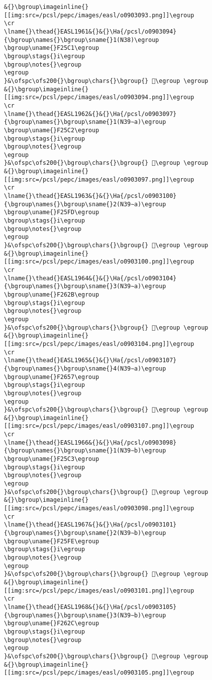 \begin{verbatim}
&{}\bgroup\imageinline{}[[img:src=/pcsl/pepc/images/easl/o0903093.png]]\egroup
\cr
\lname{}\thead{}EASL1961&{}&{}\Ha{/pcsl/o0903094}{\bgroup\names{}\bgroup\sname{}1(N38)\egroup
\bgroup\uname{}F25C1\egroup
\bgroup\stags{}i\egroup
\bgroup\notes{}\egroup
\egroup
}&\ofspc\ofs200{}\bgroup\chars{}\bgroup{} 󲗁\egroup \egroup
&{}\bgroup\imageinline{}[[img:src=/pcsl/pepc/images/easl/o0903094.png]]\egroup
\cr
\lname{}\thead{}EASL1962&{}&{}\Ha{/pcsl/o0903097}{\bgroup\names{}\bgroup\sname{}1(N39∼a)\egroup
\bgroup\uname{}F25C2\egroup
\bgroup\stags{}i\egroup
\bgroup\notes{}\egroup
\egroup
}&\ofspc\ofs200{}\bgroup\chars{}\bgroup{} 󲗂\egroup \egroup
&{}\bgroup\imageinline{}[[img:src=/pcsl/pepc/images/easl/o0903097.png]]\egroup
\cr
\lname{}\thead{}EASL1963&{}&{}\Ha{/pcsl/o0903100}{\bgroup\names{}\bgroup\sname{}2(N39∼a)\egroup
\bgroup\uname{}F25FD\egroup
\bgroup\stags{}i\egroup
\bgroup\notes{}\egroup
\egroup
}&\ofspc\ofs200{}\bgroup\chars{}\bgroup{} 󲗽\egroup \egroup
&{}\bgroup\imageinline{}[[img:src=/pcsl/pepc/images/easl/o0903100.png]]\egroup
\cr
\lname{}\thead{}EASL1964&{}&{}\Ha{/pcsl/o0903104}{\bgroup\names{}\bgroup\sname{}3(N39∼a)\egroup
\bgroup\uname{}F262B\egroup
\bgroup\stags{}i\egroup
\bgroup\notes{}\egroup
\egroup
}&\ofspc\ofs200{}\bgroup\chars{}\bgroup{} 󲘫\egroup \egroup
&{}\bgroup\imageinline{}[[img:src=/pcsl/pepc/images/easl/o0903104.png]]\egroup
\cr
\lname{}\thead{}EASL1965&{}&{}\Ha{/pcsl/o0903107}{\bgroup\names{}\bgroup\sname{}4(N39∼a)\egroup
\bgroup\uname{}F2657\egroup
\bgroup\stags{}i\egroup
\bgroup\notes{}\egroup
\egroup
}&\ofspc\ofs200{}\bgroup\chars{}\bgroup{} 󲙗\egroup \egroup
&{}\bgroup\imageinline{}[[img:src=/pcsl/pepc/images/easl/o0903107.png]]\egroup
\cr
\lname{}\thead{}EASL1966&{}&{}\Ha{/pcsl/o0903098}{\bgroup\names{}\bgroup\sname{}1(N39∼b)\egroup
\bgroup\uname{}F25C3\egroup
\bgroup\stags{}i\egroup
\bgroup\notes{}\egroup
\egroup
}&\ofspc\ofs200{}\bgroup\chars{}\bgroup{} 󲗃\egroup \egroup
&{}\bgroup\imageinline{}[[img:src=/pcsl/pepc/images/easl/o0903098.png]]\egroup
\cr
\lname{}\thead{}EASL1967&{}&{}\Ha{/pcsl/o0903101}{\bgroup\names{}\bgroup\sname{}2(N39∼b)\egroup
\bgroup\uname{}F25FE\egroup
\bgroup\stags{}i\egroup
\bgroup\notes{}\egroup
\egroup
}&\ofspc\ofs200{}\bgroup\chars{}\bgroup{} 󲗾\egroup \egroup
&{}\bgroup\imageinline{}[[img:src=/pcsl/pepc/images/easl/o0903101.png]]\egroup
\cr
\lname{}\thead{}EASL1968&{}&{}\Ha{/pcsl/o0903105}{\bgroup\names{}\bgroup\sname{}3(N39∼b)\egroup
\bgroup\uname{}F262C\egroup
\bgroup\stags{}i\egroup
\bgroup\notes{}\egroup
\egroup
}&\ofspc\ofs200{}\bgroup\chars{}\bgroup{} 󲘬\egroup \egroup
&{}\bgroup\imageinline{}[[img:src=/pcsl/pepc/images/easl/o0903105.png]]\egroup

\end{verbatim}
